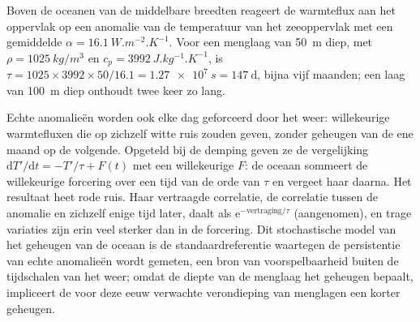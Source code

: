 \begin{example}\label{ex:b2:climate-variability:tau}
Boven de oceanen van de middelbare breedten reageert de warmteflux aan het oppervlak op een anomalie van de temperatuur van het
zeeoppervlak met een gemiddelde $\alpha = \qty{16.1}{W.m^{-2}.K^{-1}}$. Voor een menglaag
van \qty{50}{m} diep, met $\rho = \qty{1025}{kg/m^3}$ en $c_p = \qty{3992}{J.kg^{-1}.K^{-1}}$, is
$\tau = 1025 \times 3992 \times 50/16.1 = \qty{1.27e7}{s} = \qty{147}{\day}$, bijna vijf
maanden; een laag van \qty{100}{m} diep onthoudt twee keer zo lang.
\end{example}

Echte anomalieën worden ook elke dag geforceerd door het weer: willekeurige warmtefluxen die op zichzelf
witte ruis zouden geven, zonder geheugen van de ene maand op de volgende. Opgeteld bij de demping
geven ze de vergelijking $\mathrm{d}T'/\mathrm{d}t = -T'/\tau + F(t)$ met een willekeurige $F$: de oceaan sommeert
de willekeurige forcering over een tijd van de orde van $\tau$ en vergeet haar daarna. Het resultaat heet
rode ruis. Haar vertraagde correlatie, de correlatie tussen de anomalie en zichzelf enige tijd later,
daalt als $\mathrm{e}^{-\text{vertraging}/\tau}$ (aangenomen), en trage variaties zijn erin veel sterker
dan in de forcering. Dit stochastische model van het geheugen van de oceaan is de standaardreferentie
waartegen de persistentie van echte anomalieën wordt gemeten, een bron van voorspelbaarheid buiten
de tijdschalen van het weer; omdat de diepte van de menglaag het geheugen bepaalt, impliceert de voor deze eeuw
verwachte verondieping van menglagen een korter geheugen.

